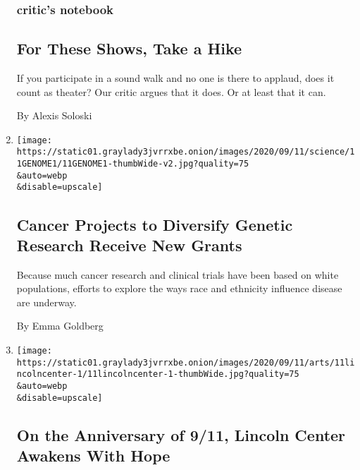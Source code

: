 \begin{enumerate}
  \hypertarget{critics-notebook}{%
  \subsubsection{critic's notebook}\label{critics-notebook}}

  \hypertarget{for-these-shows-take-a-hike}{%
  \subsection{For These Shows, Take a
  Hike}\label{for-these-shows-take-a-hike}}

  If you participate in a sound walk and no one is there to applaud,
  does it count as theater? Our critic argues that it does. Or at least
  that it can.

  By Alexis Soloski
\item
  \href{/2020/09/11/science/genetic-cancer-research-race.html}{}

  \texttt{[image: https://static01.graylady3jvrrxbe.onion/images/2020/09/11/science/11GENOME1/11GENOME1-thumbWide-v2.jpg?quality=75\\\&auto=webp\\\&disable=upscale]}

  \hypertarget{cancer-projects-to-diversify-genetic-research-receive-new-grants}{%
  \subsection{Cancer Projects to Diversify Genetic Research Receive New
  Grants}\label{cancer-projects-to-diversify-genetic-research-receive-new-grants}}

  Because much cancer research and clinical trials have been based on
  white populations, efforts to explore the ways race and ethnicity
  influence disease are underway.

  By Emma Goldberg
\item
  \href{/2020/09/11/arts/table-of-silence-9-11.html}{}

  \texttt{[image: https://static01.graylady3jvrrxbe.onion/images/2020/09/11/arts/11lincolncenter-1/11lincolncenter-1-thumbWide.jpg?quality=75\\\&auto=webp\\\&disable=upscale]}

  \hypertarget{on-the-anniversary-of-911-lincoln-center-awakens-with-hope}{%
  \subsection{On the Anniversary of 9/11, Lincoln Center Awakens With
  Hope}\label{on-the-anniversary-of-911-lincoln-center-awakens-with-hope}}


\end{enumerate}
